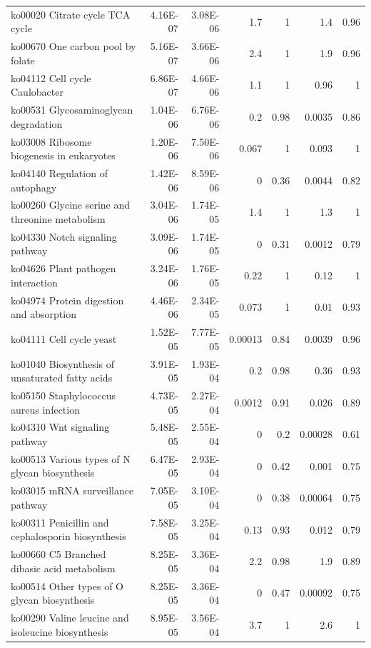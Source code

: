 {\begin{longtable}{ | l | r | r | r | r | r | r  | }
		ko00020 Citrate cycle TCA cycle  & 4.16E-07 & 3.08E-06 & 1.7 & 1 & 1.4 & 0.96 \\ 
		ko00670 One carbon pool by folate & 5.16E-07 & 3.66E-06 & 2.4 & 1 & 1.9 & 0.96 \\ 
		ko04112 Cell cycle Caulobacter & 6.86E-07 & 4.66E-06 & 1.1 & 1 & 0.96 & 1 \\ 
		ko00531 Glycosaminoglycan degradation & 1.04E-06 & 6.76E-06 & 0.2 & 0.98 & 0.0035 & 0.86 \\ 
		ko03008 Ribosome biogenesis in eukaryotes & 1.20E-06 & 7.50E-06 & 0.067 & 1 & 0.093 & 1 \\ 
		ko04140 Regulation of autophagy & 1.42E-06 & 8.59E-06 & 0 & 0.36 & 0.0044 & 0.82 \\ 
		ko00260 Glycine serine and threonine metabolism & 3.04E-06 & 1.74E-05 & 1.4 & 1 & 1.3 & 1 \\ 
		ko04330 Notch signaling pathway & 3.09E-06 & 1.74E-05 & 0 & 0.31 & 0.0012 & 0.79 \\ 
		ko04626 Plant pathogen interaction & 3.24E-06 & 1.76E-05 & 0.22 & 1 & 0.12 & 1 \\ 
		ko04974 Protein digestion and absorption & 4.46E-06 & 2.34E-05 & 0.073 & 1 & 0.01 & 0.93 \\ 
		ko04111 Cell cycle yeast & 1.52E-05 & 7.77E-05 & 0.00013 & 0.84 & 0.0039 & 0.96 \\ 
		ko01040 Biosynthesis of unsaturated fatty acids & 3.91E-05 & 1.93E-04 & 0.2 & 0.98 & 0.36 & 0.93 \\ 
		ko05150 Staphylococcus aureus infection & 4.73E-05 & 2.27E-04 & 0.0012 & 0.91 & 0.026 & 0.89 \\ 
		ko04310 Wnt signaling pathway & 5.48E-05 & 2.55E-04 & 0 & 0.2 & 0.00028 & 0.61 \\ 
		ko00513 Various types of N glycan biosynthesis & 6.47E-05 & 2.93E-04 & 0 & 0.42 & 0.001 & 0.75 \\ 
		ko03015 mRNA surveillance pathway & 7.05E-05 & 3.10E-04 & 0 & 0.38 & 0.00064 & 0.75 \\ 
		ko00311 Penicillin and cephalosporin biosynthesis & 7.58E-05 & 3.25E-04 & 0.13 & 0.93 & 0.012 & 0.79 \\ 
		ko00660 C5 Branched dibasic acid metabolism & 8.25E-05 & 3.36E-04 & 2.2 & 0.98 & 1.9 & 0.89 \\ 
		ko00514 Other types of O glycan biosynthesis & 8.25E-05 & 3.36E-04 & 0 & 0.47 & 0.00092 & 0.75 \\ 
		ko00290 Valine leucine and isoleucine biosynthesis & 8.95E-05 & 3.56E-04 & 3.7 & 1 & 2.6 & 1 \\ 

\end{longtable}}
